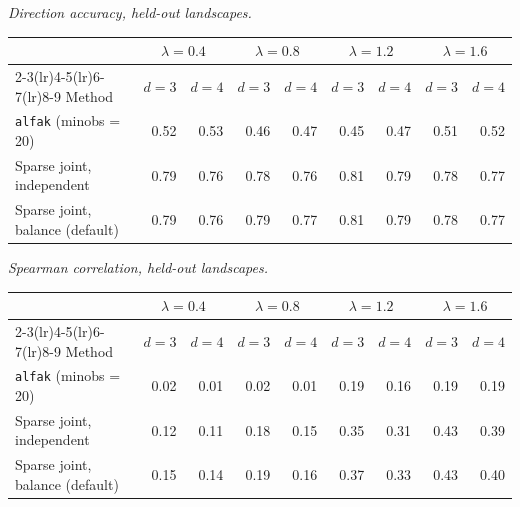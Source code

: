 \par\medskip\noindent\begin{minipage}{\linewidth}
\textit{Direction accuracy, held-out landscapes.}
\begin{center}
\footnotesize
\setlength{\tabcolsep}{3.5pt}
\begin{tabular}{l*{8}{r}}
\toprule
 & \multicolumn{2}{c}{$\lambda=0.4$} & \multicolumn{2}{c}{$\lambda=0.8$} & \multicolumn{2}{c}{$\lambda=1.2$} & \multicolumn{2}{c}{$\lambda=1.6$} \\
\cmidrule(lr){2-3}\cmidrule(lr){4-5}\cmidrule(lr){6-7}\cmidrule(lr){8-9}
Method & $d=3$ & $d=4$ & $d=3$ & $d=4$ & $d=3$ & $d=4$ & $d=3$ & $d=4$ \\
\midrule
\texttt{alfak} (minobs = 20) & 0.52 & 0.53 & 0.46 & 0.47 & 0.45 & 0.47 & 0.51 & 0.52 \\
Sparse joint, independent & 0.79 & 0.76 & 0.78 & 0.76 & 0.81 & 0.79 & 0.78 & 0.77 \\
Sparse joint, balance (default) & 0.79 & 0.76 & 0.79 & 0.77 & 0.81 & 0.79 & 0.78 & 0.77 \\
\bottomrule
\end{tabular}
\end{center}
\end{minipage}

\par\medskip\noindent\begin{minipage}{\linewidth}
\textit{Spearman correlation, held-out landscapes.}
\begin{center}
\footnotesize
\setlength{\tabcolsep}{3.5pt}
\begin{tabular}{l*{8}{r}}
\toprule
 & \multicolumn{2}{c}{$\lambda=0.4$} & \multicolumn{2}{c}{$\lambda=0.8$} & \multicolumn{2}{c}{$\lambda=1.2$} & \multicolumn{2}{c}{$\lambda=1.6$} \\
\cmidrule(lr){2-3}\cmidrule(lr){4-5}\cmidrule(lr){6-7}\cmidrule(lr){8-9}
Method & $d=3$ & $d=4$ & $d=3$ & $d=4$ & $d=3$ & $d=4$ & $d=3$ & $d=4$ \\
\midrule
\texttt{alfak} (minobs = 20) & 0.02 & 0.01 & 0.02 & 0.01 & 0.19 & 0.16 & 0.19 & 0.19 \\
Sparse joint, independent & 0.12 & 0.11 & 0.18 & 0.15 & 0.35 & 0.31 & 0.43 & 0.39 \\
Sparse joint, balance (default) & 0.15 & 0.14 & 0.19 & 0.16 & 0.37 & 0.33 & 0.43 & 0.40 \\
\bottomrule
\end{tabular}
\end{center}
\end{minipage}

